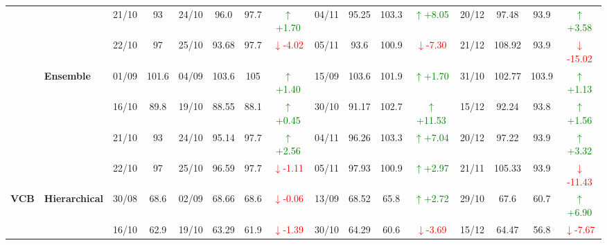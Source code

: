 {\begin{longtable}{llcc|cccc|cccc|cccc}
&
& 21/10 & 93 & 24/10 & 96.0 & 97.7 & \textcolor{green}{\(\uparrow\)+1.70} & 04/11 & 95.25 & 103.3 & \textcolor{green}{\(\uparrow\)+8.05} & 20/12 & 97.48 & 93.9 & \textcolor{green}{\(\uparrow\)+3.58} \\

&
& 22/10 & 97 & 25/10 & 93.68 & 97.7 & \textcolor{red}{\(\downarrow\)-4.02} & 05/11 & 93.6 & 100.9 & \textcolor{red}{\(\downarrow\)-7.30} & 21/12 & 108.92 & 93.9 & \textcolor{red}{\(\downarrow\)-15.02} \\
\cmidrule(lr){2-16}



& \textbf{Ensemble}
& 01/09 & 101.6 & 04/09 & 103.6 & 105 & \textcolor{green}{\(\uparrow\)+1.40} & 15/09 & 103.6 & 101.9 & \textcolor{green}{\(\uparrow\)+1.70} & 31/10 & 102.77 & 103.9 & \textcolor{green}{\(\uparrow\)+1.13} \\

&
& 16/10 & 89.8 & 19/10 & 88.55 & 88.1 & \textcolor{green}{\(\uparrow\)+0.45} & 30/10 & 91.17 & 102.7 & \textcolor{green}{\(\uparrow\)+11.53} & 15/12 & 92.24 & 93.8 & \textcolor{green}{\(\uparrow\)+1.56} \\

&
& 21/10 & 93 & 24/10 & 95.14 & 97.7 & \textcolor{green}{\(\uparrow\)+2.56} & 04/11 & 96.26 & 103.3 & \textcolor{green}{\(\uparrow\)+7.04} & 20/12 & 97.22 & 93.9 & \textcolor{green}{\(\uparrow\)+3.32} \\

&
& 22/10 & 97 & 25/10 & 96.59 & 97.7 & \textcolor{red}{\(\downarrow\)-1.11} & 05/11 & 97.93 & 100.9 & \textcolor{green}{\(\uparrow\)+2.97} & 21/11 & 105.33 & 93.9 & \textcolor{red}{\(\downarrow\)-11.43} \\
\midrule




\multirow{12}{*}{\textbf{VCB}} 
& \textbf{Hierarchical}
& 30/08 & 68.6 & 02/09 & 68.66 & 68.6 & \textcolor{red}{\(\downarrow\)-0.06} & 13/09 & 68.52 & 65.8 & \textcolor{green}{\(\uparrow\)+2.72} & 29/10 & 67.6 & 60.7 & \textcolor{green}{\(\uparrow\)+6.90} \\

&
& 16/10 & 62.9 & 19/10 & 63.29 & 61.9 & \textcolor{red}{\(\downarrow\)-1.39} & 30/10 & 64.29 & 60.6 & \textcolor{red}{\(\downarrow\)-3.69} & 15/12 & 64.47 & 56.8 & \textcolor{red}{\(\downarrow\)-7.67} \\


\end{longtable}}
